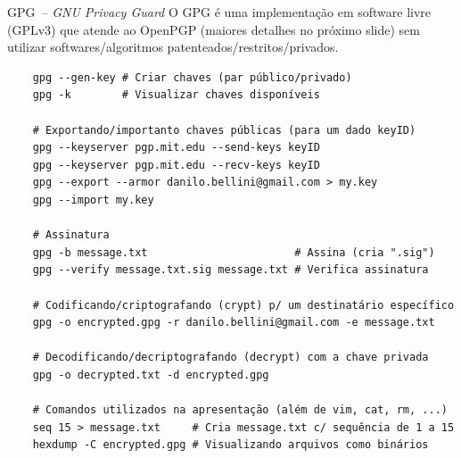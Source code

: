 \documentclass[utf8]{beamer}
\begin{document}
\begin{frame}[fragile]{GPG~-- \emph{GNU Privacy Guard}}
  O GPG é uma implementação em software livre (GPLv3)
  que atende ao OpenPGP (maiores detalhes no próximo slide)
  sem utilizar softwares/algoritmos patenteados/restritos/privados.
  \begin{verbatim}
    gpg --gen-key # Criar chaves (par público/privado)
    gpg -k        # Visualizar chaves disponíveis

    # Exportando/importanto chaves públicas (para um dado keyID)
    gpg --keyserver pgp.mit.edu --send-keys keyID
    gpg --keyserver pgp.mit.edu --recv-keys keyID
    gpg --export --armor danilo.bellini@gmail.com > my.key
    gpg --import my.key

    # Assinatura
    gpg -b message.txt                       # Assina (cria ".sig")
    gpg --verify message.txt.sig message.txt # Verifica assinatura

    # Codificando/criptografando (crypt) p/ um destinatário específico
    gpg -o encrypted.gpg -r danilo.bellini@gmail.com -e message.txt

    # Decodificando/decriptografando (decrypt) com a chave privada
    gpg -o decrypted.txt -d encrypted.gpg

    # Comandos utilizados na apresentação (além de vim, cat, rm, ...)
    seq 15 > message.txt     # Cria message.txt c/ sequência de 1 a 15
    hexdump -C encrypted.gpg # Visualizando arquivos como binários
  \end{verbatim}
\end{frame}
\end{document}

